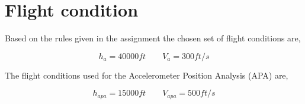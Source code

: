 \section{Flight condition}
Based on the rules given in the assignment the chosen set of flight conditions are,

\begin{equation*}
    h_a = 40000ft \qquad  V_a=300ft/s
\end{equation*}

The flight conditions used for the Accelerometer Position Analysis (APA) are,

\begin{equation*}
    h_{apa} = 15000ft \qquad  V_{apa}=500ft/s
\end{equation*}
